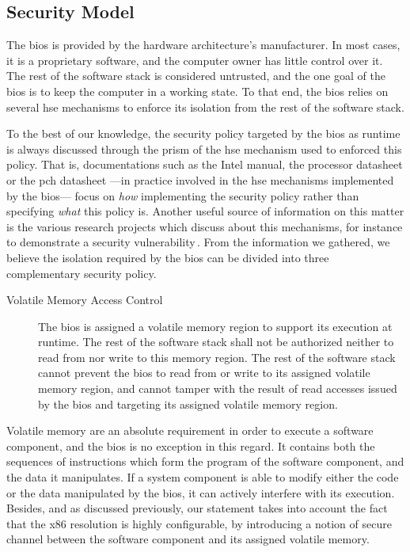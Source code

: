 \subsection{Security Model}
\label{subsec:usecase:firm:sec}

The \ac{bios} is provided by the hardware architecture’s manufacturer.
%
In most cases, it is a proprietary software, and the computer owner has little
control over it.
%
The rest of the software stack is considered untrusted, and the one goal of the
\ac{bios} is to keep the computer in a working state.
%
To that end, the \ac{bios} relies on several \ac{hse} mechanisms to enforce its
isolation from the rest of the software stack.

To the best of our knowledge, the security policy targeted by the \ac{bios} as
runtime is always discussed through the prism of the \ac{hse} mechanism used to
enforced this policy.
%
That is, documentations such as the Intel manual, the processor datasheet or the
\ac{pch} datasheet ---in practice involved in the \ac{hse} mechanisms
implemented by the \ac{bios}--- focus on \emph{how} implementing the security
policy rather than specifying \emph{what} this policy is.
%
Another useful source of information on this matter is the various research
projects which discuss about this mechanisms, for instance to demonstrate a
security
vulnerability\,\cite{duflot2009smram,wojtczuk2009smram,bulygin2014summary}.
%
From the information we gathered, we believe the isolation required by the
\ac{bios} can be divided into three complementary security policy.

\begin{description}
\item [Volatile Memory Access Control]
  The \ac{bios} is assigned a volatile memory region to support its execution at
  runtime.
  The rest of the software stack shall not be authorized neither to read from
  nor write to this memory region.
  The rest of the software stack cannot prevent the \ac{bios} to read from or
  write to its assigned volatile memory region, and cannot tamper with the
  result of read accesses issued by the \ac{bios} and targeting its assigned
  volatile memory region.
\end{description}
%
Volatile memory are an absolute requirement in order to execute a software
component, and the \ac{bios} is no exception in this regard.
%
It contains both the sequences of instructions which form the program of the
software component, and the data it manipulates.
%
If a system component is able to modify either the code or the data manipulated
by the \ac{bios}, it can actively interfere with its execution.
%
Besides, and as discussed previously, our statement takes into account the fact
that the x86 \IOs resolution is highly configurable, by introducing a notion of
secure channel  between the software component and its assigned
volatile memory.


